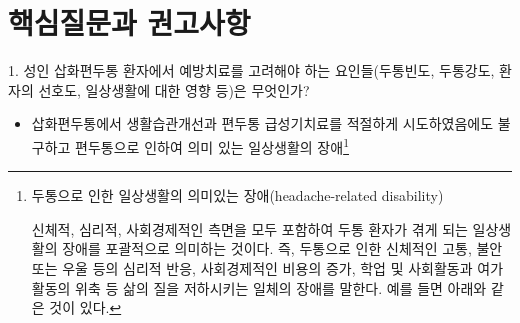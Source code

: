 \documentclass[]{book}
\let\rmarkdownfootnote\footnote%
\def\footnote{\protect\rmarkdownfootnote}
\begin{document}
\hypertarget{section-4}{%
\section{핵심질문과 권고사항}\label{section-4}}

1. 성인 삽화편두통 환자에서 예방치료를 고려해야 하는 요인들(두통빈도, 두통강도, 환자의 선호도, 일상생활에 대한 영향 등)은 무엇인가?

\begin{itemize}
\item
  삽화편두통에서 생활습관개선과 편두통 급성기치료를 적절하게 시도하였음에도 불구하고 편두통으로 인하여 의미 있는 일상생활의 장애\footnote{두통으로 인한 일상생활의 의미있는 장애(headache-related disability)

    신체적, 심리적, 사회경제적인 측면을 모두 포함하여 두통 환자가 겪게 되는 일상생활의 장애를 포괄적으로 의미하는 것이다. 즉, 두통으로 인한 신체적인 고통, 불안 또는 우울 등의 심리적 반응, 사회경제적인 비용의 증가, 학업 및 사회활동과 여가활동의 위축 등 삶의 질을 저하시키는 일체의 장애를 말한다. 예를 들면 아래와 같은 것이 있다.

}
\end{itemize}
\end{document}
